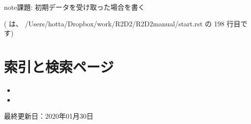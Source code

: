\documentclass[letterpaper,10pt,dvipdfmx,report]{sphinxmanual}
\begin{document}
\begin{sphinxadmonition}{note}{課題:}
初期データを受け取った場合を書く
\end{sphinxadmonition}

({\hyperref[\detokenize{start:id14}]{}} は、 /Users/hotta/Dropbox/work/R2D2/R2D2\sphinxhyphen{}manual/start.rst の 198 行目です)


\chapter{索引と検索ページ}
\label{\detokenize{index:id3}}\begin{itemize}
\item {} 

\item {} 

\end{itemize}

最終更新日：2020年01月30日


\renewcommand{\indexname}{Pythonモジュール索引}
\begin{sphinxtheindex}
\let\bigletter\sphinxstyleindexlettergroup
\bigletter{r}
\item\relax{}
\end{sphinxtheindex}

\renewcommand{\indexname}{索引}
\printindex
\end{document}
